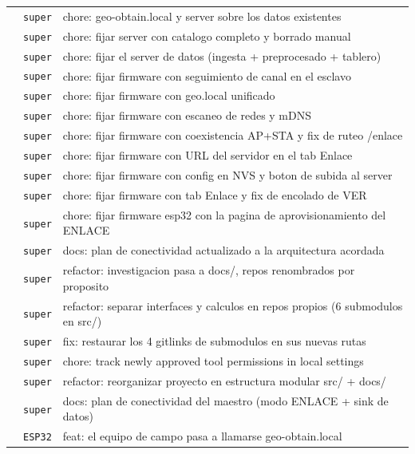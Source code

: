 \begin{longtable}{@{}p{1.7cm} p{1.5cm} p{12.2cm}@{}}
 & \texttt{\scriptsize super} & chore: geo-obtain.local y server sobre los datos existentes \\
 & \texttt{\scriptsize super} & chore: fijar server con catalogo completo y borrado manual \\
 & \texttt{\scriptsize super} & chore: fijar el server de datos (ingesta + preprocesado + tablero) \\
 & \texttt{\scriptsize super} & chore: fijar firmware con seguimiento de canal en el esclavo \\
 & \texttt{\scriptsize super} & chore: fijar firmware con geo.local unificado \\
 & \texttt{\scriptsize super} & chore: fijar firmware con escaneo de redes y mDNS \\
 & \texttt{\scriptsize super} & chore: fijar firmware con coexistencia AP+STA y fix de ruteo /enlace \\
 & \texttt{\scriptsize super} & chore: fijar firmware con URL del servidor en el tab Enlace \\
 & \texttt{\scriptsize super} & chore: fijar firmware con config en NVS y boton de subida al server \\
 & \texttt{\scriptsize super} & chore: fijar firmware con tab Enlace y fix de encolado de VER \\
 & \texttt{\scriptsize super} & chore: fijar firmware esp32 con la pagina de aprovisionamiento del ENLACE \\
 & \texttt{\scriptsize super} & docs: plan de conectividad actualizado a la arquitectura acordada \\
 & \texttt{\scriptsize super} & refactor: investigacion pasa a docs/, repos renombrados por proposito \\
 & \texttt{\scriptsize super} & refactor: separar interfaces y calculos en repos propios (6 submodulos en src/) \\
 & \texttt{\scriptsize super} & fix: restaurar los 4 gitlinks de submodulos en sus nuevas rutas \\
 & \texttt{\scriptsize super} & chore: track newly approved tool permissions in local settings \\
 & \texttt{\scriptsize super} & refactor: reorganizar proyecto en estructura modular src/ + docs/ \\
 & \texttt{\scriptsize super} & docs: plan de conectividad del maestro (modo ENLACE + sink de datos) \\
 & \texttt{\scriptsize ESP32} & feat: el equipo de campo pasa a llamarse geo-obtain.local \\

\end{longtable}
